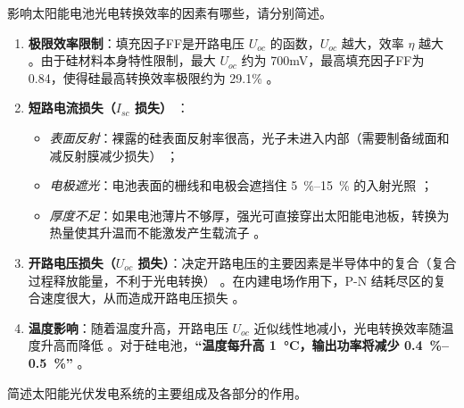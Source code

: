 \begin{problem}\label{exer:think_04_solar_11}
影响太阳能电池光电转换效率的因素有哪些，请分别简述。
\end{problem}

\begin{solution}
\begin{enumerate}
\item \textbf{极限效率限制}：填充因子FF是开路电压 \(U_{oc}\) 的函数，\(U_{oc}\) 越大，效率 \(\eta\) 越大 。由于硅材料本身特性限制，最大 \(U_{oc}\) 约为 700mV，最高填充因子FF为0.84，使得硅最高转换效率极限约为 29.1\% 。
\item \textbf{短路电流损失（\(I_{sc}\) 损失）} ：
\begin{itemize}
\item \emph{表面反射}：裸露的硅表面反射率很高，光子未进入内部（需要制备绒面和减反射膜减少损失） ；
\item \emph{电极遮光}：电池表面的栅线和电极会遮挡住 \qtyrange{5}{15}{\%} 的入射光照 ；
\item \emph{厚度不足}：如果电池薄片不够厚，强光可直接穿出太阳能电池板，转换为热量使其升温而不能激发产生载流子 。
\end{itemize}
\item \textbf{开路电压损失（\(U_{oc}\) 损失）}：决定开路电压的主要因素是半导体中的复合（复合过程释放能量，不利于光电转换） 。在内建电场作用下，P-N 结耗尽区的复合速度很大，从而造成开路电压损失 。
\item \textbf{温度影响}：随着温度升高，开路电压 \(U_{oc}\) 近似线性地减小，光电转换效率随温度升高而降低 。对于硅电池，\textbf{“温度每升高 \qty{1}{\degreeCelsius}，输出功率将减少 \qtyrange{0.4}{0.5}{\%}”} 。
\end{enumerate}
\end{solution}

\begin{problem}\label{exer:think_04_solar_12}
简述太阳能光伏发电系统的主要组成及各部分的作用。
\end{problem}

